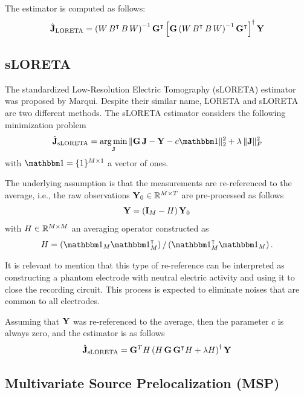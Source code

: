 The estimator is computed as follows:
\begin{equation}
\hat{\mathbf{J}}_\text{LORETA} 
= 
\left(  W\, B^\intercal\, B\, W  \right)^{-1}
\mathbf{G}^\intercal
\left[  \mathbf{G} \left(  W\, B^\intercal\, B\, W  \right)^{-1} \mathbf{G}^\intercal  \right]^\dagger
\mathbf{Y}
\label{est:LORETA}
\end{equation}

\subsection{sLORETA}

The standardized Low-Resolution Electric Tomography (sLORETA) estimator was proposed by Marqui\cite{sloreta}.
%
Despite their similar name, LORETA and sLORETA are two different methods.
%
The sLORETA estimator considers the following minimization problem
\begin{equation}
\hat{\J}_\text{sLORETA} 
= 
\argmin_{\J}\, \nnorm{\G\, \J - \Y - c \ones }_2^2 + \lambda\, \nnorm{\J}_F^2
\end{equation}
with $\ones=\{1\}^{M\times 1}$ a vector of ones.

The underlying assumption is that the measurements are re-referenced to the average, i.e., the raw observations $\mathbf{Y}_0\in \mathbb{R}^{M\times T}$ are pre-processed as follows
\begin{equation}
\mathbf{Y} = \left(  \mathbf{I}_M - H  \right) \mathbf{Y}_0
\end{equation}
with $H \in \mathbb{R}^{M \times M}$ an averaging operator constructed as
\begin{equation}
H = \ppar{\ones_M \ones_M\trans}/\ppar{\ones_M\trans \ones_M}.
\end{equation}

It is relevant to mention that this type of re-reference can be interpreted as constructing a phantom electrode with neutral electric activity and using it to close the recording circuit.
%
This process is expected to eliminate noises that are common to all electrodes.

Assuming that $\mathbf{Y}$ was re-referenced to the average, then the parameter $c$ is always zero, and the estimator is as follows
\begin{equation}
\hat{\mathbf{J}}_{\text{sLORETA}} =
\mathbf{G}^T H 
\left( 
H\, \mathbf{G} \,\mathbf{G}^\intercal 
H + 
\lambda H
 \right)^\dagger
\mathbf{Y}
\label{est:sLORETA}
\end{equation}

\subsection{Multivariate Source Prelocalization (MSP)}

